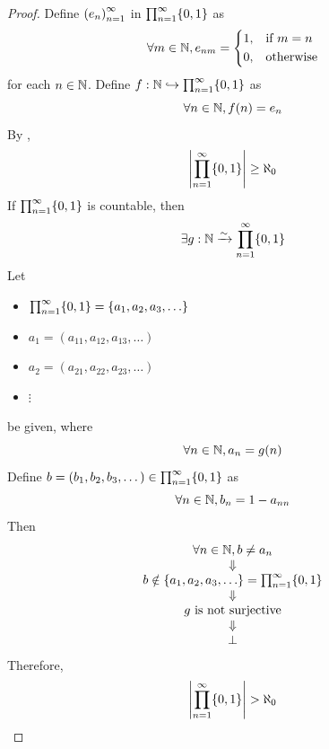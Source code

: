 \begin{proof}
    Define $\paren*{e_{n}}_{n = 1}^{\infty}$ in $\prod_{n = 1}^{\infty} \set*{0, 1}$ as
    \[
    \forall m \in \N, e_{nm} = \begin{dcases}
        1, & \text{if } m = n \\
        0, & \text{otherwise}
    \end{dcases}
    \]
    for each $n \in \N$. Define $f: \N \hookrightarrow \prod_{n = 1}^{\infty} \set*{0, 1}$ as
    \[
    \forall n \in \N, f(n) = e_{n}
    \]
    By ,
    \[
    \abs*{\prod_{n = 1}^{\infty} \set*{0, 1}} \geq \aleph_{0}
    \]
    If $\prod_{n = 1}^{\infty} \set*{0, 1}$ is countable, then
    \[
    \exists g: \N \xrightarrow{\sim} \prod_{n = 1}^{\infty} \set*{0, 1}
    \]
    Let
    \begin{itemize}
        \item $\prod_{n = 1}^{\infty} \set*{0, 1} = \set*{a_{1}, a_{2}, a_{3}, \dots}$
        \item $a_{1} = (a_{11}, a_{12}, a_{13}, \dots)$
        \item $a_{2} = (a_{21}, a_{22}, a_{23}, \dots)$
        \item[] $\vdots$
    \end{itemize}
    be given, where
    \[
    \forall n \in \N, a_{n} = g(n)
    \]
    Define $b = (b_{1}, b_{2}, b_{3}, \dots) \in \prod_{n = 1}^{\infty} \set*{0, 1}$ as
    \[
    \forall n \in \N, b_{n} = 1 - a_{nn}
    \]
    Then
    \[
    \begin{array}{c}
        \forall n \in \N, b \neq a_{n} \\
        \Downarrow \\
        b \notin \set*{a_{1}, a_{2}, a_{3}, \dots} = \prod_{n = 1}^{\infty} \set*{0, 1} \\
        \Downarrow \\
        g \text{ is not surjective} \\
        \Downarrow \\
        \bot
    \end{array}
    \]
    Therefore,
    \[
    \abs*{\prod_{n = 1}^{\infty} \set*{0, 1}} > \aleph_{0}
    \]
\end{proof}
